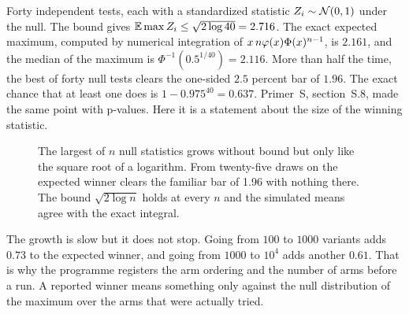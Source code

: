 \begin{example}\label{ex:ch12:forty}
Forty independent tests, each with a standardized statistic $Z_i\sim\mathcal{N}(0,1)$ under the null. The bound gives $\mathbb{E}\max Z_i\le\sqrt{2\log40}=2.716$. The exact expected maximum, computed by numerical integration of $x\,n\varphi(x)\Phi(x)^{n-1}$, is $2.161$, and the median of the maximum is $\Phi^{-1}(0.5^{1/40})=2.116$. More than half the time, the best of forty null tests clears the one-sided $2.5$ percent bar of $1.96$. The exact chance that at least one does is $1-0.975^{40}=0.637$. Primer~S, section~S.8, made the same point with p-values. Here it is a statement about the size of the winning statistic.
\end{example}

\begin{figure}[tbp]
\centering
{}
\caption{The largest of $n$ null statistics grows without bound but only like the square root of a logarithm. From twenty-five draws on the expected winner clears the familiar bar of 1.96 with nothing there. The bound $\sqrt{2\log n}$ holds at every $n$ and the simulated means agree with the exact integral.}
\label{fig:ch12:max}
\end{figure}

The growth is slow but it does not stop. Going from $100$ to $1000$ variants adds $0.73$ to the expected winner, and going from $1000$ to $10^4$ adds another $0.61$. That is why the programme registers the arm ordering and the number of arms before a run. A reported winner means something only against the null distribution of the maximum over the arms that were actually tried.


